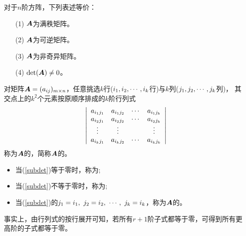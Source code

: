 \begin{frame}
  \begin{dingli}
    对于$n$阶方阵，下列表述等价：
    \begin{itemize}
    \item[(1)] $\boldsymbol{A}$为满秩矩阵。
    \item[(2)] $\boldsymbol{A}$为可逆矩阵。
    \item[(3)] $\boldsymbol{A}$为非奇异矩阵。
    \item[(4)] $\mathrm{det}(\boldsymbol{A})\ne 0$。
    \end{itemize}
  \end{dingli} 
\end{frame}

\begin{frame}
  \begin{dingyi}[子式与主子式]
    对矩阵$\boldsymbol{A}=(a_{ij})_{m\times n}$，任意挑选$k$行($i_1,i_2,\cdots,i_k$行)与$k$列($j_1,j_2,\cdots,j_k$列)，
    其交点上的$k^2$个元素按原顺序排成的$k$阶行列式
    \begin{equation}\label{subdet}
      \left|
        \begin{array}{cccc}
          a_{i_1j_1} & a_{i_1j_2} & \cdots & a_{i_1j_k}\\
          a_{i_2j_1} & a_{i_2j_2} & \cdots & a_{i_2j_k}\\
          \vdots & \vdots && \vdots\\
          a_{i_kj_1} & a_{i_kj_2} & \cdots & a_{i_kj_k}\\
        \end{array}
      \right|
    \end{equation}
    称为$\boldsymbol{A}$的，简称$\boldsymbol{A}$的。 
    \begin{itemize}
    \item 当(\ref{subdet})等于零时，称为;
    \item 当(\ref{subdet})不等于零时，称为;
    \item 当(\ref{subdet})的$j_1=i_1,~j_2=i_2,~\cdots,~j_k=i_k$，称为$\boldsymbol{A}$的。
    \end{itemize}
  \end{dingyi}
\end{frame}

\begin{frame}
  \begin{zhu*}
  \end{zhu*}
  事实上，由行列式的按行展开可知，若所有$r+1$阶子式都等于零，可得到所有更高阶的子式都等于零。

\end{frame}


